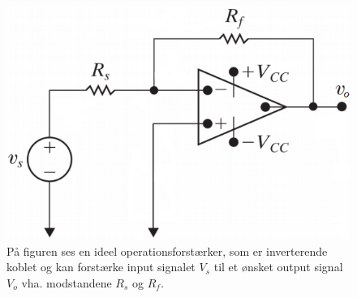 \begin{figure}[H]
\centering
\includegraphics[scale=0.6]{figures/bProblemanalyse/inverterendeforstaerker.png}
\caption{På figuren ses en ideel operationsforstærker, som er inverterende koblet og kan forstærke input signalet $V_{s}$ til et ønsket output signal $V_{o}$ vha. modstandene $R_ {s}$ og $R_{f}$. \cite{Nilsson2011}}
\label{invf}
\end{figure}


